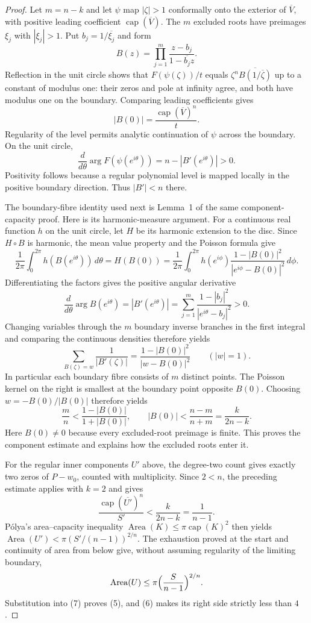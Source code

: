 \begin{proof}
Let $m=n-k$ and let $\psi$ map $|\zeta|>1$ conformally onto the
exterior of $\overline V$, with positive leading coefficient
$\operatorname{cap}(\overline V)$. The $m$ excluded roots have preimages
$\xi_j$ with $|\xi_j|>1$. Put $b_j=1/\overline{\xi_j}$ and form
\[
 B(z)=\prod_{j=1}^m\frac{z-b_j}{1-\overline{b_j}z}.
\]
Reflection in the unit circle shows that $F(\psi(\zeta))/t$ equals
$\zeta^n\overline{B(1/\overline\zeta)}$ up to a constant of modulus one:
their zeros and pole at infinity agree, and both have modulus one on
the boundary. Comparing leading coefficients gives
\[
 |B(0)|=\frac{\operatorname{cap}(\overline V)^n}{t}.
\]
Regularity of the level permits analytic continuation of $\psi$ across
the boundary. On the unit circle,
\[
 \frac{d}{d\theta}\arg F(\psi(e^{i\theta}))
 =n-|B'(e^{i\theta})|>0.
\]
Positivity follows because a regular polynomial level is mapped locally
in the positive boundary direction. Thus $|B'|<n$ there.

The boundary-fibre identity used next is Lemma~1 of the same
component-capacity proof. Here is its harmonic-measure argument.
For a continuous real function $h$ on the unit circle, let $H$ be its
harmonic extension to the disc. Since $H\circ B$ is harmonic, the mean
value property and the Poisson formula give
\[
 \frac1{2\pi}\int_0^{2\pi}h(B(e^{i\theta}))\,d\theta
 =H(B(0))
 =\frac1{2\pi}\int_0^{2\pi}h(e^{i\phi})
   \frac{1-|B(0)|^2}{|e^{i\phi}-B(0)|^2}\,d\phi.
\]
Differentiating the factors gives the positive angular derivative
\[
 \frac{d}{d\theta}\arg B(e^{i\theta})
 =|B'(e^{i\theta})|
 =\sum_{j=1}^m\frac{1-|b_j|^2}{|e^{i\theta}-b_j|^2}>0.
\]
Changing variables through the $m$ boundary inverse branches in the
first integral and comparing the continuous densities therefore yields
\[
 \sum_{B(\zeta)=w}\frac1{|B'(\zeta)|}
 =\frac{1-|B(0)|^2}{|w-B(0)|^2}\qquad(|w|=1).
\]
In particular each boundary fibre consists of $m$ distinct points.
The Poisson kernel on the right is smallest at the boundary point
opposite $B(0)$. Choosing $w=-B(0)/|B(0)|$ therefore yields
\[
 \frac mn<\frac{1-|B(0)|}{1+|B(0)|},
 \qquad |B(0)|<\frac{n-m}{n+m}=\frac{k}{2n-k}.
\]
Here $B(0)\ne0$ because every excluded-root preimage is finite. This proves
the component estimate and explains how the excluded roots enter it.

For the regular inner components $U'$ above, the degree-two count gives
exactly two zeros of $P-w_0$, counted with multiplicity. Since $2<n$,
the preceding estimate applies with $k=2$ and gives
\[
 \frac{\operatorname{cap}(\overline{U'})^n}{S'}
 <\frac{k}{2n-k}=\frac1{n-1}.
\]
P\'olya's area--capacity inequality
$\operatorname{Area}(K)\le\pi\operatorname{cap}(K)^2$ \cite[Theorem~6]{crane}
then yields
$\operatorname{Area}(U')<\pi(S'/(n-1))^{2/n}$. The exhaustion proved
at the start and continuity of area from below give, without assuming
regularity of the limiting boundary,
\[
 \operatorname{Area}(U)\le\pi\Bigl(\frac{S}{n-1}\Bigr)^{2/n}.
\]
Substitution into (7) proves (5), and (6) makes its right side strictly less
than $4$.
\end{proof}

